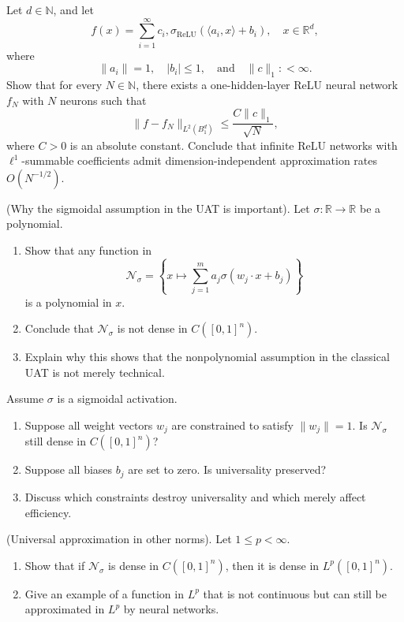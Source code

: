 \begin{myexercise}
Let $d \in \mathbb{N}$, and let
$$
f(x) = \sum_{i=1}^\infty c_i ,\sigma_{\mathrm{ReLU}}(\langle a_i, x\rangle + b_i),
\quad x \in \mathbb{R}^d,
$$
where
$$
\|a_i\| = 1, \quad |b_i| \le 1, \quad \text{and} \quad \|c\|_1 : < \infty.
$$
Show that for every $N \in \mathbb{N}$, there exists a one-hidden-layer ReLU neural network $f_N$ with $N$ neurons such that
$$
\|f - f_N\|_{L^2(B_1^d)} \le \frac{C \|c\|_1}{\sqrt{N}},
$$
where $C>0$ is an absolute constant. Conclude that infinite ReLU networks with $\ell^1$-summable coefficients admit dimension-independent approximation rates $O(N^{-1/2})$.
\end{myexercise}

\begin{myexercise} (Why the sigmoidal assumption in the UAT is important).
Let $\sigma:\mathbb{R}\to\mathbb{R}$ be a polynomial. 
\begin{enumerate}[label=(\alph*)]
\item Show that any function in 
$$\mathcal{N}_\sigma =
   \left\{
   x\mapsto \sum_{j=1}^m a_j \sigma(w_j\cdot x + b_j)
   \right\}
   $$
   is a polynomial in $x$.

\item Conclude that $\mathcal{N}_\sigma$ is not dense in $C([0,1]^n)$.

\item Explain why this shows that the nonpolynomial assumption in the classical UAT is not merely technical.
\end{enumerate}
\end{myexercise}


\begin{myexercise}
Assume $\sigma$ is a sigmoidal activation.
\begin{enumerate}[label=(\alph*)]
\item Suppose all weight vectors $w_j$ are constrained to satisfy $\|w_j\| = 1$. Is $\mathcal{N}_\sigma$ still dense in $C([0,1]^n)$?
\item Suppose all biases $b_j$ are set to zero. Is universality preserved?
\item Discuss which constraints destroy universality and which merely affect efficiency.
\end{enumerate}

\end{myexercise}


\begin{myexercise}(Universal approximation in other norms).
Let $1 \le p < \infty$. 
\begin{enumerate}[label=(\alph*)]
\item Show that if $\mathcal{N}_\sigma$ is dense in $C([0,1]^n)$, then it is dense in $L^p([0,1]^n)$.
\item Give an example of a function in $L^p$ that is not continuous but can still be approximated in $L^p$ by neural networks.
\end{enumerate}

\end{myexercise}


